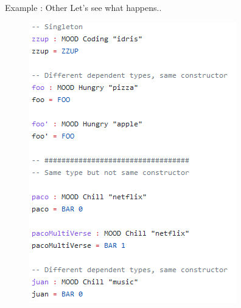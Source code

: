 \documentclass{beamer}
\newcommand{\othertitle}{Example : Other}
\begin{document}
	\begin{frame}[fragile]{\othertitle}
		Let's see what happens..
		\begin{figure}
			\includegraphics[scale=0.56]{pics/random-code-2}
		\end{figure}
	\end{frame}
	
	
\end{document}
